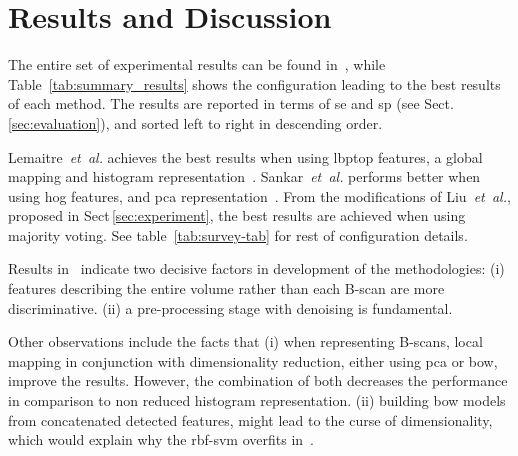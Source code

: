 \section{Results and Discussion}\label{sec:results}\label{sec:discussion}

The entire set of experimental results can be found in~\cite{rethinopaty20016apr-repoICPR}, while Table~\ref{tab:summary_results} shows the configuration leading to the best results of each method.
The results are reported in terms of \gls{se} and \gls{sp} (see Sect.\,\ref{sec:evaluation}), and sorted left to right in descending order.

Lemaitre~\emph{et~al.} achieves the best results when using \gls{lbptop} features, a global mapping and histogram representation~\cite{Lemaintre2015miccaiOCT}.
Sankar~\emph{et~al.} performs better when using \gls{hog} features, and \gls{pca} representation~\cite{Alsaih2016apr-repoICPR}.
From the modifications of Liu~\emph{et~al.}, proposed in Sect\,\ref{sec:experiment}, the best results are achieved when using majority voting.
See table~\ref{tab:survey-tab} for rest of configuration details.

Results in~\cite{rethinopaty20016apr-repoICPR} indicate two decisive factors in development of the methodologies:
(i) features describing the entire volume rather than each B-scan are more discriminative.
(ii) a pre-processing stage with denoising is fundamental.

Other observations include the facts that
(i) when representing B-scans, local mapping in conjunction with dimensionality reduction, either using \gls{pca} or \gls{bow}, improve the results.
However, the combination of both decreases the performance in comparison to non reduced histogram representation.
(ii) building \gls{bow} models from concatenated detected features, might lead to the curse of dimensionality, which would explain why the \gls{rbf}-\gls{svm} overfits in~\cite{Alsaih2016apr-repoICPR, liu20016apr-repoICPR}.

